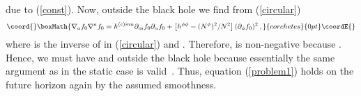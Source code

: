 \documentclass[a4paper,12pt]{article}
\begin{document}
due to (\ref{const}).
Now, outside the black hole we find from (\ref{circular}) 
\[\coord{}\boxMath{
\nabla_a f_0 \nabla^a f_0
= h^{(c)mn}\partial_m f_0 \partial_n f_0
+ \left[h^{\phi\phi}-(N^\phi)^2/N^2\right](\partial_\phi f_0)^2\,,
}{corchetes}{0pt}\coordE{}\]
where \coordHE{} is the inverse of \coordHE{} in (\ref{circular}) and 
\coordHE{}.
Therefore, \coordHE{} 
is non-negative because \coordHE{}.
Hence, we must have \coordHE{} and \coordHE{} outside the black hole 
because essentially the same argument as in the static case is valid~\cite{BE2}.
Thus, equation (\ref{problem1}) holds
on the future horizon
again by the assumed smoothness.
\end{document}
